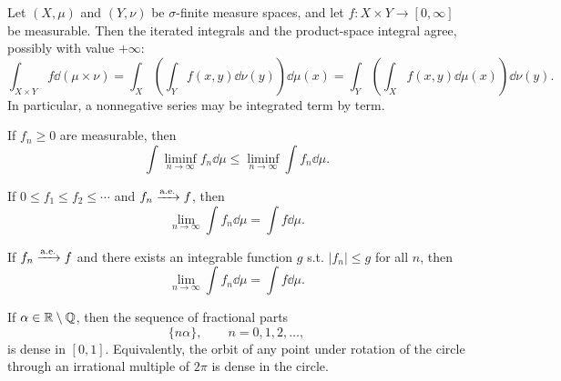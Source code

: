     \begin{theorem}
        Let $(X,\mu)$ and $(Y,\nu)$ be $\sigma$-finite measure spaces, and let
        $f:X\times Y\to[0,\infty]$ be measurable. Then the iterated integrals
        and the product-space integral agree, possibly with value $+\infty$:
        \[
            \int_{X\times Y}f\dd(\mu\times\nu)
            =
            \int_X\left(\int_Y f(x,y)\dd\nu(y)\right)\dd\mu(x)
            =
            \int_Y\left(\int_X f(x,y)\dd\mu(x)\right)\dd\nu(y).
        \]
        In particular, a nonnegative series may be integrated term by term.
    \end{theorem}

    \begin{theorem}
        If $f_n\geq 0$ are measurable, then
        \[
            \int \liminf_{n\to\infty}f_n\dd\mu
            \leq
            \liminf_{n\to\infty}\int f_n\dd\mu.
        \]
    \end{theorem}

    \begin{theorem}
        If $0\leq f_1\leq f_2\leq\cdots$ and $f_n\xrightarrow{\mathrm{a.e.}} f$,
        then
        \[
            \lim\limits_{n\to\infty}\int f_n\dd\mu
            =
            \int f\dd\mu.
        \]
    \end{theorem}

    \begin{theorem}
        If $f_n\xrightarrow{\mathrm{a.e.}} f$ and there exists an integrable function
        $g$ s.t. $|f_n|\leq g$ for all $n$, then
        \[
            \lim\limits_{n\to\infty}\int f_n\dd\mu
            =
            \int f\dd\mu.
        \]
    \end{theorem}

    \begin{theorem}
        If $\alpha\in\mathbb{R}\setminus\mathbb{Q}$, then the sequence of fractional parts
        \[
            \{n\alpha\},\qquad n=0,1,2,\dots,
        \]
        is dense in $[0,1]$. Equivalently, the orbit of any point under rotation
        of the circle through an irrational multiple of $2\pi$ is dense in the
        circle.
    \end{theorem}

